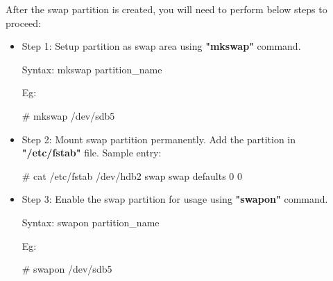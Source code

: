 \setlength{\columnsep}{3pt}
\begin{flushleft}
	
After the swap partition is created, you will need to perform below steps to proceed:
\begin{itemize}
	\item Step 1: Setup partition as swap area using \textbf{"mkswap"} command.
	\begin{tcolorbox}[breakable,notitle,boxrule=-0pt,colback=pink,colframe=pink]
		\color{black}
		\font=9pt
		Syntax: mkswap partition\_name
		\font=4pt
	\end{tcolorbox}
	
	Eg:
	\begin{tcolorbox}[breakable,notitle,boxrule=-0pt,colback=black,colframe=black]
		\color{green}
		\font=9pt
		\# mkswap /dev/sdb5
		\font=4pt
	\end{tcolorbox}

	\bigskip
	\bigskip
	
	\item Step 2: Mount swap partition permanently. Add the partition in \textbf{"/etc/fstab"} file.
	\newline
	Sample entry:
	\bigskip
	\begin{tcolorbox}[breakable,notitle,boxrule=-0pt,colback=black,colframe=black]
		\color{green}
		\font=9pt
		\# cat /etc/fstab
		\newline
		\color{white}
		/dev/hdb2 swap swap defaults 0 0
		\font=4pt
	\end{tcolorbox}
		
	\bigskip
	\bigskip
		
	\item Step 3: Enable the swap partition for usage using \textbf{"swapon"} command.
	\begin{tcolorbox}[breakable,notitle,boxrule=-0pt,colback=pink,colframe=pink]
		\color{black}
		\font=9pt
		Syntax: swapon partition\_name
		\font=4pt
	\end{tcolorbox}
	
	Eg:
	\begin{tcolorbox}[breakable,notitle,boxrule=-0pt,colback=black,colframe=black]
		\color{green}
		\font=9pt
		\# swapon /dev/sdb5
		\font=4pt
	\end{tcolorbox}
	

\end{itemize}
\end{flushleft}

